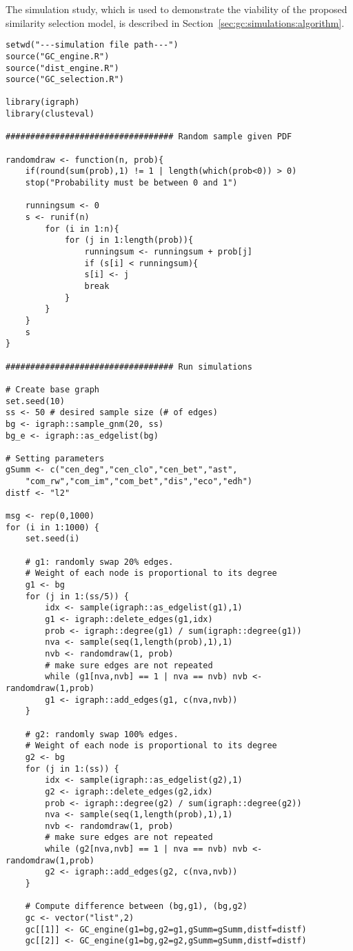 The simulation study, which is used to demonstrate the viability of the 
proposed similarity selection model, is described in 
Section~\ref{sec:gc:simulations:algorithm}.

{
\begin{lstlisting}
setwd("---simulation file path---")
source("GC_engine.R")
source("dist_engine.R")
source("GC_selection.R")

library(igraph)
library(clusteval)

################################## Random sample given PDF

randomdraw <- function(n, prob){
	if(round(sum(prob),1) != 1 | length(which(prob<0)) > 0) 
	stop("Probability must be between 0 and 1")
	
	runningsum <- 0
	s <- runif(n)
		for (i in 1:n){
			for (j in 1:length(prob)){
				runningsum <- runningsum + prob[j]
				if (s[i] < runningsum){
				s[i] <- j
				break
			} 
		}
	}
	s
}

################################## Run simulations

# Create base graph
set.seed(10)
ss <- 50 # desired sample size (# of edges)
bg <- igraph::sample_gnm(20, ss)
bg_e <- igraph::as_edgelist(bg)

# Setting parameters
gSumm <- c("cen_deg","cen_clo","cen_bet","ast",
	"com_rw","com_im","com_bet","dis","eco","edh")
distf <- "l2"

msg <- rep(0,1000)
for (i in 1:1000) {
	set.seed(i)
	
	# g1: randomly swap 20% edges. 
	# Weight of each node is proportional to its degree
	g1 <- bg
	for (j in 1:(ss/5)) {
		idx <- sample(igraph::as_edgelist(g1),1)
		g1 <- igraph::delete_edges(g1,idx)
		prob <- igraph::degree(g1) / sum(igraph::degree(g1))
		nva <- sample(seq(1,length(prob),1),1)
		nvb <- randomdraw(1, prob)
		# make sure edges are not repeated
		while (g1[nva,nvb] == 1 | nva == nvb) nvb <- randomdraw(1,prob)
		g1 <- igraph::add_edges(g1, c(nva,nvb))
	}
	
	# g2: randomly swap 100% edges. 
	# Weight of each node is proportional to its degree
	g2 <- bg
	for (j in 1:(ss)) {
		idx <- sample(igraph::as_edgelist(g2),1)
		g2 <- igraph::delete_edges(g2,idx)
		prob <- igraph::degree(g2) / sum(igraph::degree(g2))
		nva <- sample(seq(1,length(prob),1),1)
		nvb <- randomdraw(1, prob)
		# make sure edges are not repeated
		while (g2[nva,nvb] == 1 | nva == nvb) nvb <- randomdraw(1,prob)
		g2 <- igraph::add_edges(g2, c(nva,nvb))
	}
	
	# Compute difference between (bg,g1), (bg,g2)
	gc <- vector("list",2)
	gc[[1]] <- GC_engine(g1=bg,g2=g1,gSumm=gSumm,distf=distf)
	gc[[2]] <- GC_engine(g1=bg,g2=g2,gSumm=gSumm,distf=distf)
	

\end{lstlisting}}
